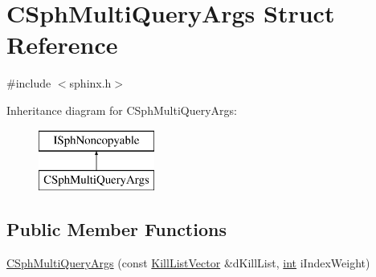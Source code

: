\hypertarget{structCSphMultiQueryArgs}{\section{C\-Sph\-Multi\-Query\-Args Struct Reference}
\label{structCSphMultiQueryArgs}
}


{\ttfamily \#include $<$sphinx.\-h$>$}

Inheritance diagram for C\-Sph\-Multi\-Query\-Args\-:\begin{figure}[H]
\begin{center}
\leavevmode
\includegraphics[height=2.000000cm]{structCSphMultiQueryArgs}
\end{center}
\end{figure}
\subsection*{Public Member Functions}
\begin{DoxyCompactItemize}
\item 
\hyperlink{structCSphMultiQueryArgs_a6a46eab83b585f460a3be247e07ddca2}{C\-Sph\-Multi\-Query\-Args} (const \hyperlink{sphinx_8h_a1510ca22159d6c94f7fd300b5d3be431}{Kill\-List\-Vector} \&d\-Kill\-List, \hyperlink{sphinxexpr_8cpp_a4a26e8f9cb8b736e0c4cbf4d16de985e}{int} i\-Index\-Weight)
\end{DoxyCompactItemize}
